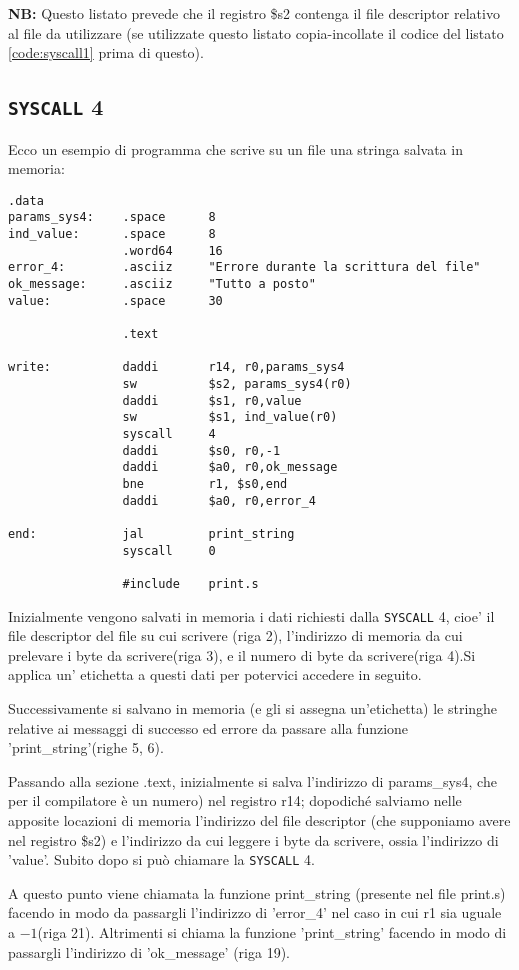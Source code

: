 \documentclass[12pt]{report}
\newcommand{\SC}{\texttt{SYSCALL}}
\newcommand{\OF}{\textbf{NB:} Questo listato prevede che il registro \$s2 contenga il file descriptor
relativo al file da utilizzare (se utilizzate questo listato copia-incollate il codice del listato \ref{code:syscall1} prima di questo).}
\begin{document}
\OF{}
\subsection{\SC{} 4}
Ecco un esempio di programma che scrive su un file una stringa salvata in memoria:
\begin{lstlisting}[caption={Esempio \SC{} 4}, label={code:syscall4}, style={mips}]
                .data
params_sys4:    .space      8                
ind_value:      .space      8            
                .word64     16        
error_4:        .asciiz     "Errore durante la scrittura del file"    
ok_message:     .asciiz     "Tutto a posto"    
value:          .space      30                    

                .text
            
write:          daddi       r14, r0,params_sys4        
                sw          $s2, params_sys4(r0)        
                daddi       $s1, r0,value            
                sw          $s1, ind_value(r0)            
                syscall     4                
                daddi       $s0, r0,-1
                daddi       $a0, r0,ok_message            
                bne         r1, $s0,end            
                daddi       $a0, r0,error_4

end:            jal         print_string
                syscall     0
        
                #include    print.s 
\end{lstlisting}

Inizialmente vengono salvati in memoria i dati richiesti dalla \SC{} 4, cioe' il
file descriptor del file su cui scrivere (riga 2), l'indirizzo di memoria da cui
prelevare i byte da scrivere(riga 3), e il numero di byte da scrivere(riga 4).Si
applica un' etichetta a questi dati per potervici accedere in seguito.

Successivamente si salvano in memoria (e gli si assegna un'etichetta) le
stringhe relative ai messaggi di successo ed errore da passare alla funzione
'print\_string'(righe 5, 6).

Passando alla sezione .text, inizialmente si salva l'indirizzo di params\_sys4,
che per il compilatore \`{e} un numero) nel registro r14; dopodich\'{e} salviamo
nelle apposite locazioni di memoria l'indirizzo del file descriptor (che
supponiamo avere nel registro \$s2) e l'indirizzo da cui leggere i byte da
scrivere, ossia l'indirizzo di 'value'. Subito dopo si pu\`{o} chiamare la \SC{}
4.

A questo  punto viene chiamata la funzione print\_string (presente nel file
print.s) facendo in modo da passargli l'indirizzo di 'error\_4' nel caso in cui
r1 sia uguale a $-1$(riga 21). Altrimenti si chiama la funzione
'print\_string' facendo in modo di passargli l'indirizzo di 'ok\_message' (riga
19).
\end{document}
